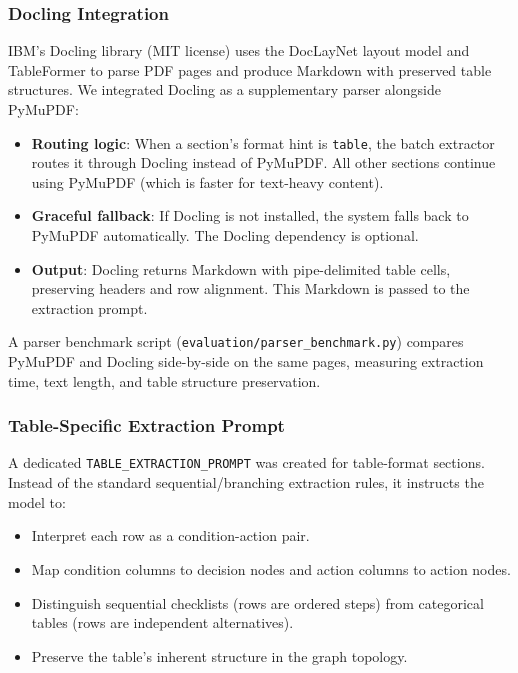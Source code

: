 \documentclass[12pt,a4paper]{article}
\begin{document}
\subsubsection{Docling Integration}

IBM's Docling library (MIT license) uses the DocLayNet layout model and TableFormer to parse PDF pages and produce Markdown with preserved table structures. We integrated Docling as a supplementary parser alongside PyMuPDF:

\begin{itemize}[leftmargin=2em]
    \item \textbf{Routing logic}: When a section's format hint is \texttt{table}, the batch extractor routes it through Docling instead of PyMuPDF. All other sections continue using PyMuPDF (which is faster for text-heavy content).
    \item \textbf{Graceful fallback}: If Docling is not installed, the system falls back to PyMuPDF automatically. The Docling dependency is optional.
    \item \textbf{Output}: Docling returns Markdown with pipe-delimited table cells, preserving headers and row alignment. This Markdown is passed to the extraction prompt.
\end{itemize}

A parser benchmark script (\texttt{evaluation/parser\_benchmark.py}) compares PyMuPDF and Docling side-by-side on the same pages, measuring extraction time, text length, and table structure preservation.

\subsubsection{Table-Specific Extraction Prompt}

A dedicated \texttt{TABLE\_EXTRACTION\_PROMPT} was created for table-format sections. Instead of the standard sequential/branching extraction rules, it instructs the model to:
\begin{itemize}[leftmargin=2em]
    \item Interpret each row as a condition-action pair.
    \item Map condition columns to decision nodes and action columns to action nodes.
    \item Distinguish sequential checklists (rows are ordered steps) from categorical tables (rows are independent alternatives).
    \item Preserve the table's inherent structure in the graph topology.
\end{itemize}
\end{document}
